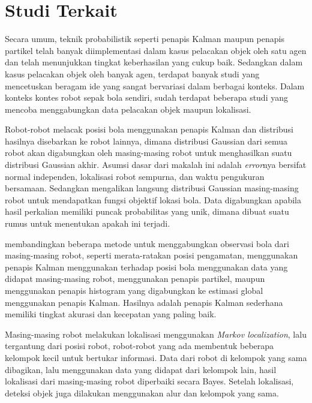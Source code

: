 \section{Studi Terkait}

Secara umum, teknik probabilistik seperti penapis Kalman maupun penapis partikel telah banyak diimplementasi dalam kasus pelacakan objek oleh satu agen dan telah menunjukkan tingkat keberhasilan yang cukup baik. Sedangkan dalam kasus pelacakan objek oleh banyak agen, terdapat banyak studi yang mencetuskan beragam ide yang sangat bervariasi dalam berbagai konteks. Dalam konteks kontes robot sepak bola sendiri, sudah terdapat beberapa studi yang mencoba menggabungkan data pelacakan objek maupun lokalisasi.

Robot-robot \citet{stroupe2001} melacak posisi bola menggunakan penapis Kalman dan distribusi hasilnya disebarkan ke robot lainnya, dimana distribusi Gaussian dari semua robot akan digabungkan oleh masing-masing robot untuk menghasilkan suatu distribusi Gaussian akhir. Asumsi dasar dari makalah ini adalah \textit{error}nya bersifat normal independen, lokalisasi robot sempurna, dan waktu pengukuran bersamaan. Sedangkan \citet{pinheiro2004} mengalikan langsung distribusi Gaussian masing-masing robot untuk mendapatkan fungsi objektif lokasi bola. Data digabungkan apabila hasil perkalian memiliki puncak probabilitas yang unik, dimana dibuat suatu rumus untuk menentukan apakah ini terjadi.

\citet{ferrein2005} membandingkan beberapa metode untuk menggabungkan observasi bola dari masing-masing robot, seperti merata-ratakan posisi pengamatan, menggunakan penapis Kalman menggunakan terhadap posisi bola menggunakan data yang didapat masing-masing robot, menggunakan penapis partikel, maupun menggunakan penapis histogram yang digabungkan ke estimasi global menggunakan penapis Kalman. Hasilnya adalah penapis Kalman sederhana memiliki tingkat akurasi dan kecepatan yang paling baik.

Masing-masing robot \citet{pahliani2006} melakukan lokalisasi menggunakan \textit{Markov localization}, lalu tergantung dari posisi robot, robot-robot yang ada membentuk beberapa kelompok kecil untuk bertukar informasi. Data dari robot di kelompok yang sama dibagikan, lalu menggunakan data yang didapat dari kelompok lain, hasil lokalisasi dari masing-masing robot diperbaiki secara Bayes. Setelah lokalisasi, deteksi objek juga dilakukan menggunakan alur dan kelompok yang sama.

